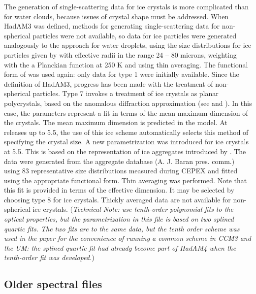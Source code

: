 The generation of single-scattering data for ice crystals is more
complicated than for water clouds, because issues of crystal shape
must be addressed. When HadAM3 was defined, methods for generating 
single-scattering data for non-spherical particles were not available,
so data for ice particles were generated analogously to the approach
for water droplets, using the size distributions for ice particles 
given by \citet{Rockel91}
with effective radii in the range 24 -- 80 microns, 
weighting with the a Planckian 
function at 250 K and using thin averaging. The functional form of 
\citet{Slingo82} was used again: only data for type 1 were initially
available.
Since the definition of HadAM3, progress has been made with the treatment
of non-spherical particles. Type 7 invokes a treatment of ice crystals
as planar polycrystals, based on the anomalous diffraction approximation
(see \citet{Kristjansson99} and \citet{Kristjansson00}). 
In this case, the
parameters represent a fit in terms of the mean maximum dimension of
the crystals. The mean maximum dimension is predicted in the model. At
releases up to 5.5, the use of this ice scheme automatically selects this
method of specifying the crystal size. 
A new parametrization \citep{Edwards07} was introduced for ice crystals at 5.5. This is based
on the representation of ice aggregates introduced by \citet{Baran03}.
The data were generated from the aggregate database (A. J. Baran pres. comm.)
using 83 representative size distributions measured during CEPEX and fitted
using the appropriate functional form. Thin averaging was performed. Note
that this fit is provided in terms of the effective dimension. It may be
selected by choosing type 8 for ice crystals.
Thickly averaged data are not
available for non-spherical ice crystals.
({\it Technical Note: \citet{Kristjansson00} use tenth-order polynomial
fits to the optical properties, but the parametrization
in this file is based on two
splined quartic fits. The two fits are to the same data, but the tenth
order scheme was used in the paper for the convenience of running a
common scheme in CCM3 and the UM: the splined quartic fit had already
become part of HadAM4 when the tenth-order fit was developed.}) 


\subsection{Older spectral files}

